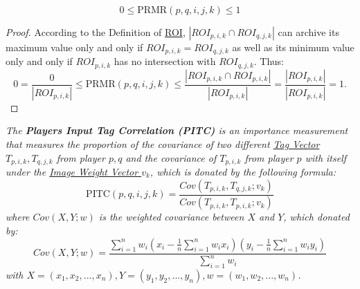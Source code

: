 
\begin{lemma}
\label{lemma:prmrrange}
\begin{equation}
\label{eq:prmrrange}
0 \leq \text{PRMR}(p, q, i, j, k) \leq 1
\end{equation}
\end{lemma}
\begin{proof}
According to the Definition of \hyperref[def:roi]{ROI}, $| ROI_{p,i,k} \cap ROI_{q,j,k} |$ 
can archive its maximum value only and only if $ROI_{p,i,k} =  ROI_{q,j,k}$ 
as well as its minimum value only and only if $ROI_{p,i,k}$ has no intersection with $ROI_{q,j,k}$.
Thus:
\[
0 = \frac{0}{|ROI_{p,i,k}|} \leq \text{PRMR}(p, q, i, j, k) \leq
\frac{| ROI_{p,i,k} \cap ROI_{p,i,k} | }{|ROI_{p,i,k}|} = \frac{|ROI_{p,i,k}|}{|ROI_{p,i,k}|} = 1.
\]
\end{proof}

\begin{definition}
\label{def:pitc}
\emph{
The \textbf{Players Input Tag Correlation (PITC)} is an importance measurement that measures the proportion of
the covariance of two different \hyperref[def:tagv]{Tag Vector $T_{p,i,k}, T_{q,j,k}$} from player $p, q$ and the covariance of $T_{p,i,k}$ from player $p$ with itself under the
\hyperref[def:weightvk]{Image Weight Vector $v_k$}, which is donated by the following formula:
\begin{equation}
\text{PITC}(p, q, i, j, k) = \frac{Cov(T_{p,i,k}, T_{q,j,k}; v_k)}{Cov(T_{p,i,k}, T_{p,i,k}; v_k)}
\end{equation}
where $Cov(X, Y; w)$ is the weighted covariance between $X$ and $Y$, which donated by:
\begin{equation}
\label{eq:cov}
Cov(X, Y; w) = \frac{\sum_{i=1}^{n}{w_i(x_i-\frac{1}{n}\sum_{i=1}^{n}{w_i x_i})(y_i-\frac{1}{n}\sum_{i=1}^{n}{w_i y_i})}}{\sum_{i=1}^{n}{w_i}}
\end{equation}
with $X = (x_1, x_2, ..., x_n), Y = (y_1, y_2, ..., y_n), w = (w_1, w_2, ..., w_n)$.
}
\end{definition}


